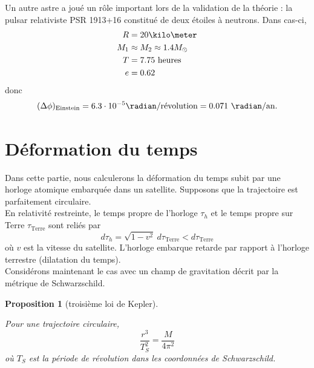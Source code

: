 \documentclass[a4paper,11pt]{report}
\theoremstyle{definition}
\theoremstyle{plain}
\newtheorem{prop}[thm]{Proposition}
\theoremstyle{definition}
\theoremstyle{remark}
\begin{document}
            Un autre astre a joué un rôle important lors de la validation de la théorie : la pulsar relativiste PSR 1913+16 constitué de deux étoiles à neutrons. Dans cas-ci,
            \begin{align}
                R &= 20\kilo\meter\\
                M_1 &\approx M_2 \approx 1.4M_{\odot}\\
                T &= 7.75\text{ heures}\\
                e &= 0.62
            \end{align}
            donc
            \begin{equation}
                (\Delta\phi)_{\text{Einstein}} = 6.3\cdot10^{-5}\radian/\text{révolution} = 0.071~\radian/\text{an}.
            \end{equation}
            
    \section{Déformation du temps}
    
        Dans cette partie, nous calculerons la déformation du temps subit par une horloge atomique embarquée dans un satellite. Supposons que la trajectoire est parfaitement circulaire.\\
        
        En relativité restreinte, le temps propre de l'horloge $\tau_h$ et le temps propre sur Terre $\tau_{\text{Terre}}$ sont reliés par
        \begin{equation}
            d\tau_h = \sqrt{1-v^2}~d\tau_{\text{Terre}} < d\tau_{\text{Terre}}
        \end{equation}
        où $v$ est la vitesse du satellite. L'horloge embarque retarde par rapport à l'horloge terrestre (dilatation du temps).\\
        
        Considérons maintenant le cas avec un champ de gravitation décrit par la métrique de Schwarzschild.
        
        \begin{prop}[troisième loi de Kepler]\begin{leftbar}
            Pour une trajectoire circulaire, 
            \begin{equation}
                \frac{r^3}{T^2_S} = \frac{M}{4\pi^2}
            \end{equation}
            où $T_S$ est la période de révolution dans les coordonnées de Schwarzschild.
        \end{leftbar}\end{prop}
        
\end{document}
